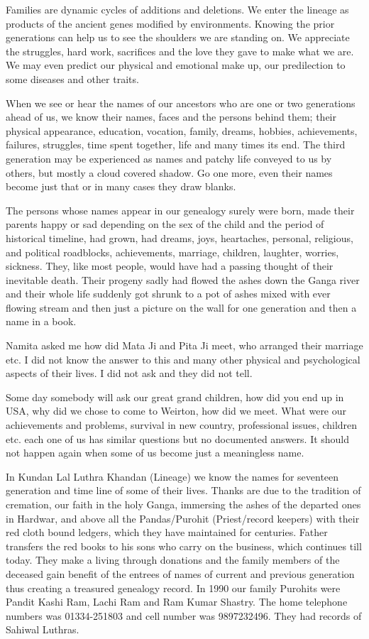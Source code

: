 Families are dynamic cycles of additions and deletions. We enter the lineage as products of the ancient genes modified by environments. 
Knowing the prior generations can help us to see the shoulders we are standing on. We appreciate the struggles, hard work, sacrifices and the love they gave to make what we are. We may even predict our physical and emotional make up, our predilection to some diseases and other traits.

When we see or hear the names of our ancestors who are one or two generations ahead of us, we know their names, faces and the persons behind them; their physical appearance, education, vocation, family, dreams, hobbies, achievements, failures, struggles, time spent together, life and many times its end. The third generation may be experienced as names and patchy life conveyed to us by others, but mostly a cloud covered shadow. Go one more, even their names become just that or in many cases they draw blanks. 

The persons whose names appear in our genealogy surely were born, made their parents happy or sad depending on the sex of the child and the period of historical timeline, had grown, had dreams, joys, heartaches, personal, religious, and political roadblocks, achievements, marriage, children, laughter, worries, sickness. They, like most people, would have had a passing thought of their inevitable death. Their progeny sadly had flowed the ashes down the Ganga river and their whole life suddenly got shrunk to a pot of ashes mixed with ever flowing stream and then just a picture on the wall for one generation and then a name in a book. 

Namita asked me how did Mata Ji and Pita Ji meet, who arranged their marriage etc. I did not know the answer to this and many other physical and psychological aspects of their lives. I did not ask and they did not tell. 

Some day somebody will ask our great grand children, how did you end up in USA, why did we chose to come to Weirton, how did we meet. What were our achievements and problems, survival in new country, professional issues, children etc. each one of us has similar questions but no documented answers. It should not happen again when some of us become just a meaningless name. 

In Kundan Lal Luthra Khandan (Lineage) we know the names for seventeen generation and time line of some of their lives. Thanks are due to the tradition of cremation, our faith in the holy Ganga, immersing the ashes of the departed ones in Hardwar, and above all the Pandas/Purohit (Priest/record keepers) with their red cloth bound ledgers, which they have maintained for centuries. Father transfers the red books to his sons who carry on the business, which continues till today. They make a living through donations and the family members of the deceased gain benefit of the entrees of names of current and previous generation thus creating a treasured genealogy record. In 1990 our family Purohits were Pandit Kashi Ram, Lachi Ram and Ram Kumar Shastry. The home telephone numbers was 01334-251803 and cell number was 9897232496. They had records of Sahiwal Luthras. 

